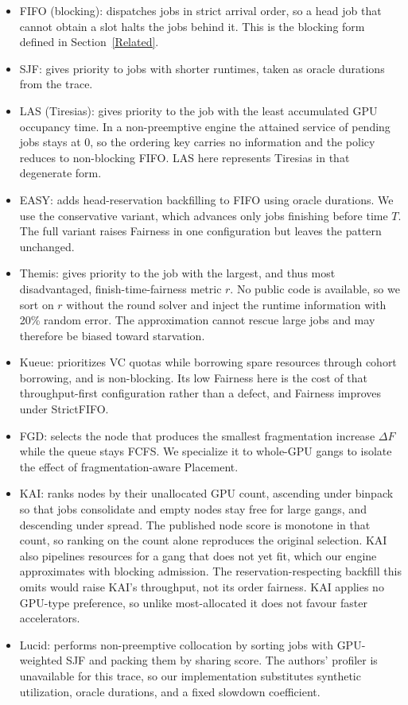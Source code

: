 \documentclass{ieeetj}
\begin{document}
\begin{itemize}
\item FIFO (blocking): dispatches jobs in strict arrival order, so a head job that cannot obtain a slot halts the jobs behind it. This is the blocking form defined in Section~\ref{Related}.
\item SJF: gives priority to jobs with shorter runtimes, taken as oracle durations from the trace.
\item LAS (Tiresias): gives priority to the job with the least accumulated GPU occupancy time. In a non-preemptive engine the attained service of pending jobs stays at 0, so the ordering key carries no information and the policy reduces to non-blocking FIFO. LAS here represents Tiresias in that degenerate form.
\item EASY: adds head-reservation backfilling to FIFO using oracle durations. We use the conservative variant, which advances only jobs finishing before time $T$. The full variant raises Fairness in one configuration but leaves the pattern unchanged.
\item Themis: gives priority to the job with the largest, and thus most disadvantaged, finish-time-fairness metric $r$. No public code is available, so we sort on $r$ without the round solver and inject the runtime information with 20\% random error. The approximation cannot rescue large jobs and may therefore be biased toward starvation.
\item Kueue: prioritizes VC quotas while borrowing spare resources through cohort borrowing, and is non-blocking. Its low Fairness here is the cost of that throughput-first configuration rather than a defect, and Fairness improves under StrictFIFO.
\item FGD: selects the node that produces the smallest fragmentation increase $\Delta F$ while the queue stays FCFS. We specialize it to whole-GPU gangs to isolate the effect of fragmentation-aware Placement.
\item KAI: ranks nodes by their unallocated GPU count, ascending under binpack so that jobs consolidate and empty nodes stay free for large gangs, and descending under spread. The published node score is monotone in that count, so ranking on the count alone reproduces the original selection. KAI also pipelines resources for a gang that does not yet fit, which our engine approximates with blocking admission. The reservation-respecting backfill this omits would raise KAI's throughput, not its order fairness. KAI applies no GPU-type preference, so unlike most-allocated it does not favour faster accelerators.
\item Lucid: performs non-preemptive collocation by sorting jobs with GPU-weighted SJF and packing them by sharing score. The authors' profiler is unavailable for this trace, so our implementation substitutes synthetic utilization, oracle durations, and a fixed slowdown coefficient.
\end{itemize}
\end{document}
